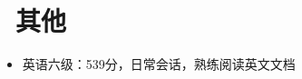 \documentclass{resume}
\begin{document}
\section{\faPlusCircle\ 其他}
\begin{itemize}[parsep=0.5ex]
  \item 英语六级：539分，日常会话，熟练阅读英文文档
\end{itemize}

%
%
\end{document}
